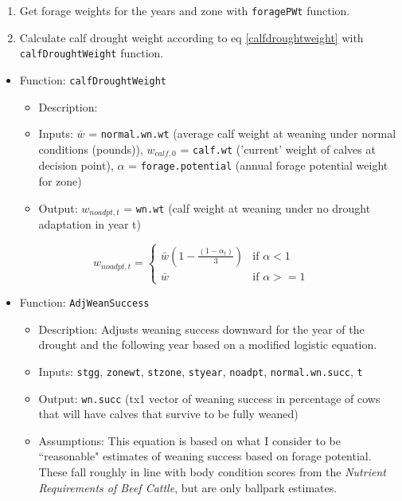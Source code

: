 \documentclass[11pt]{article}
\begin{document}
\begin{enumerate}
\item Get forage weights for the years and zone with \verb!foragePWt! function.
\item Calculate calf drought weight according to eq \ref{calfdroughtweight} with \verb!calfDroughtWeight! function.
\end{enumerate}



\begin{itemize}
\item Function: \verb!calfDroughtWeight!
	\begin{itemize}
	\item Description:
	\item Inputs: $\bar{w}$ = \verb!normal.wn.wt! (average calf weight at weaning under normal conditions (pounds)), $w_{calf, 0}$ = \verb!calf.wt! ('current' weight of calves at decision point), $\alpha$ = \verb!forage.potential! (annual forage potential weight for zone)
	\item Output: $w_{noadpt, t}$ = \verb!wn.wt! (calf weight at weaning under no drought adaptation in year t)
	\end{itemize}
\end{itemize}
\begin{equation} \label{calfdroughtweight}
w_{noadpt, t} = 
\begin{cases}
\bar{w} \left(1 - \frac{(1 - \alpha_t)}{3}\right) & \text{if } \alpha < 1 \\
\bar{w} & \text{if } \alpha >= 1
\end{cases}
\end{equation}

\begin{itemize}
\item Function: \verb!AdjWeanSuccess!
	\begin{itemize}
	\item Description: Adjusts weaning success downward for the year of the drought and the following year based on a modified logistic equation. 
	\item Inputs: \verb!stgg!, \verb!zonewt!, \verb!stzone!, \verb!styear!, \verb!noadpt!, \verb!normal.wn.succ!, \verb!t!
	\item Output: \verb!wn.succ! (tx1 vector of weaning success in percentage of cows that will have calves that survive to be fully weaned)
	\item Assumptions: This equation is based on what I consider to be ``reasonable" estimates of weaning success based on forage potential. These fall roughly in line with body condition scores from the \textit{Nutrient Requirements of Beef Cattle}, but are only ballpark estimates.
	\end{itemize}
\end{itemize}
\end{document}
